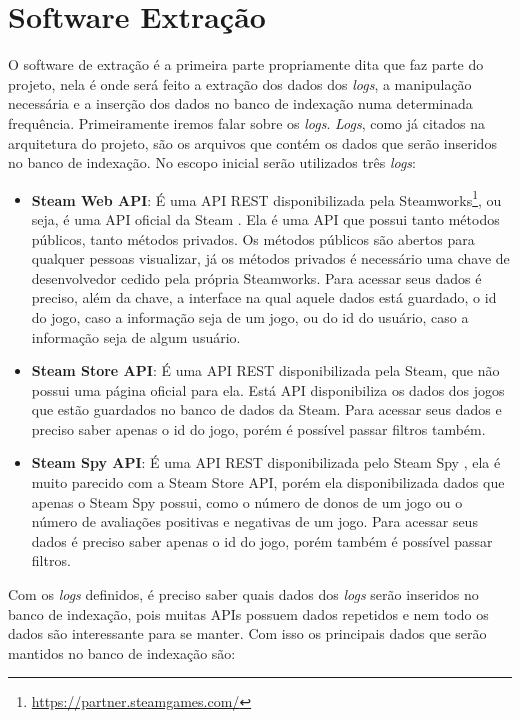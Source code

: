 \section{Software Extração}
O software de extração é a primeira parte propriamente dita que faz parte do projeto, nela é onde será feito a extração dos dados dos \textit{logs}, a manipulação necessária e a inserção dos dados no banco de indexação numa determinada frequência. Primeiramente iremos falar sobre os \textit{logs}. \textit{Logs}, como já citados na arquitetura do projeto, são os arquivos que contém os dados que serão inseridos no banco de indexação. No escopo inicial serão utilizados três \textit{logs}:
\begin{itemize}
	\item \textbf{Steam Web API}: É uma API REST disponibilizada pela Steamworks\footnote[7]{\url{https://partner.steamgames.com/}}, ou seja, é uma API oficial da Steam \cite{steam_api}. Ela é uma API que possui tanto métodos públicos, tanto métodos privados. Os métodos públicos são abertos para qualquer pessoas visualizar, já os métodos privados é necessário uma chave de desenvolvedor cedido pela própria Steamworks. Para acessar seus dados é preciso, além da chave, a interface na qual aquele dados está guardado, o id do jogo, caso a informação seja de um jogo, ou do id do usuário, caso a informação seja de algum usuário.
	\item \textbf{Steam Store API}: É uma API REST disponibilizada pela Steam, que não possui uma página oficial para ela. Está API disponibiliza os dados dos jogos que estão guardados no banco de dados da Steam. Para acessar seus dados e preciso saber apenas o id do jogo, porém é possível passar filtros também.
	\item \textbf{Steam Spy API}: É uma API REST disponibilizada pelo Steam Spy \cite{steam_spy}, ela é muito parecido com a Steam Store API, porém ela disponibilizada dados que apenas o Steam Spy possui, como o número de donos de um jogo ou o número de avaliações positivas e negativas de um jogo. Para acessar seus dados é preciso saber apenas o id do jogo, porém também é possível passar filtros.
\end{itemize}
Com os \textit{logs} definidos, é preciso saber quais dados dos \textit{logs} serão inseridos no banco de indexação, pois muitas APIs possuem dados repetidos e nem todo os dados são interessante para se manter. Com isso os principais dados que serão mantidos no banco de indexação são:
